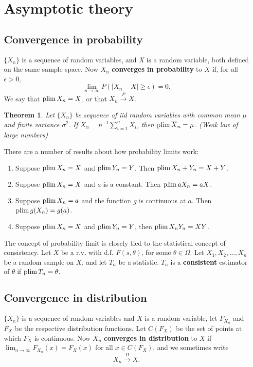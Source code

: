 \documentclass[twoside]{article}
\newtheorem{theorem}{Theorem}%
\begin{document}
\section{Asymptotic theory}

\subsection{Convergence in probability}

$\{X_n\}$ is a sequence of random variables, and $X$ is a random variable, both
defined on the same sample space. Now $X_n$ \textbf{converges in probability} to $X$
if, for all $\epsilon>0$,
\[\lim_{n\rightarrow\infty} P( |X_n-X|\geq \epsilon) = 0.\] We say that
$\operatorname{plim} X_n = X$, or that $X_n \xrightarrow{P} X$.

\begin{theorem}
Let $\{X_n\}$ be sequence of iid random variables with common mean $\mu$ and
finite variance $\sigma^2$. If $\overline{X}_n = n^{-1}\sum_{i=1}^n X_i$, then
$\operatorname{plim} \overline{X}_n=\mu$. (Weak law of large numbers)
\end{theorem}

There are a number of results about how probability limits work:
\begin{enumerate}
\item Suppose $\operatorname{plim} X_n=X$ and $\operatorname{plim} Y_n=Y$. Then $\operatorname{plim} X_n+Y_n = X+Y$.
\item Suppose $\operatorname{plim} X_n=X$ and $a$ is a constant. Then $\operatorname{plim} a X_n = aX$.
\item Suppose $\operatorname{plim} X_n=a$ and the function $g$ is continuous at $a$. Then $\operatorname{plim} g(X_n)=g(a)$.
\item Suppose $\operatorname{plim} X_n=X$ and $\operatorname{plim} Y_n=Y$, then $\operatorname{plim} X_nY_n=XY$.
\end{enumerate}

The concept of probability limit is closely tied to the statistical concept
of consistency. Let $X$ be a r.v. with d.f. $F(s,\theta)$, for some $\theta\in\Omega$.
Let $X_1,X_2,\dots,X_n$ be a random sample on $X$, and let $T_n$ be a statistic.
$T_n$ is a \textbf{consistent} estimator of $\theta$ if $\operatorname{plim} T_n = \theta$.

\subsection{Convergence in distribution}
$\{X_n\}$ is a sequence of random variables and $X$ is a random variable,
let $F_{X_n}$ and $F_X$ be the respective distribution functions. Let 
$C(F_X)$ be the set of points at which $F_X$ is continuous. Now $X_n$ \textbf{converges in
distribution} to $X$ if $\lim_{n\rightarrow\infty} F_{X_n}(x) = F_X(x)$ for all
$x\in C(F_X)$, and we sometimes write \[X_n \xrightarrow{D} X.\]
\end{document}
